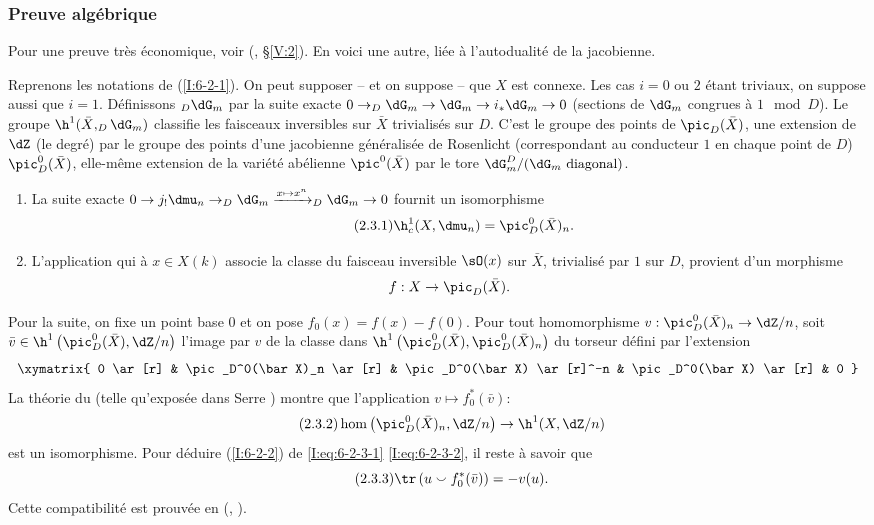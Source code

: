 \subsubsection{Preuve algébrique}\label{I:6-2-3}

Pour une preuve très économique, voir (, \S\ref{V:2}). 
En voici une autre, liée à l'autodualité de la jacobienne. 

Reprenons les notations de (\ref{I:6-2-1}). On peut supposer -- et on suppose -- 
que $X$ est connexe. Les cas $i=0$ ou $2$ étant triviaux, on suppose aussi 
que $i=1$. Définissons $_D\dG_m$ par la suite exacte 
$0\to _D\dG_m \to \dG_m \to i_*\dG_m\to 0$ (sections de $\dG_m$ congrues à 
$1\mod D$). Le groupe $\h^1(\bar X, _D\dG_m)$ classifie les faisceaux 
inversibles sur $\bar X$ trivialisés sur $D$. C'est le groupe des points de 
$\pic_D(\bar X)$, une extension de $\dZ$ (le degré) par le groupe des points 
d'une jacobienne généralisée de Rosenlicht (correspondant au conducteur 
$1$ en chaque point de $D$) $\pic_D^0(\bar X)$, elle-même extension de la 
variété abélienne $\pic^0(\bar X)$ par le tore 
$\dG_m^D/(\text{$\dG_m$ diagonal})$. 

\begin{enumerate}[\indent a)]
  \item {}La suite exacte 
    $0\to j_!\dmu_n \to _D\dG_m \xrightarrow{x\mapsto x^n} _D\dG_m\to 0$ fournit un 
    isomorphisme 
    \begin{equation*}\tag{2.3.1}\label{I:eq:6-2-3-1}
      \h_c^1(X,\dmu_n) = \pic_D^0(\bar X)_n \text{.}
    \end{equation*}
  \item L'application qui à $x\in X(k)$ associe la classe du faisceau 
    inversible $\sO(x)$ sur $\bar X$, trivialisé par $1$ sur $D$, provient 
    d'un morphisme 
    \[
      f:X \to \pic_D(\bar X) \text{.}
    \]
\end{enumerate}
Pour la suite, on fixe un point base $0$ et on pose $f_0(x)=f(x)-f(0)$. Pour 
tout homomorphisme $v:\pic_D^0(\bar X)_n \to \dZ/n$, soit 
$\bar v\in \h^1\left(\pic_D^0(\bar X),\dZ/n\right)$ l'image par $v$ de la classe 
dans $\h^1\left(\pic_D^0(\bar X),\pic_D^0(\bar X)_n\right)$ du torseur défini 
par l'extension 
\[\xymatrix{
  0 \ar[r] 
    & \pic_D^0(\bar X)_n \ar[r] 
    & \pic_D^0(\bar X) \ar[r]^-n 
    & \pic_D^0(\bar X) \ar[r] 
    & 0
}\]
La théorie du  (telle qu'exposée dans 
Serre ) montre que l'application $v\mapsto f_0^*(\bar v)$: 
\begin{equation*}\tag{2.3.2}\label{I:eq:6-2-3-2}
  \hom\left(\pic_D^0(\bar X)_n,\dZ/n\right) \to \h^1(X,\dZ/n)
\end{equation*}
est un isomorphisme. Pour déduire (\ref{I:6-2-2}) de \eqref{I:eq:6-2-3-1} 
\eqref{I:eq:6-2-3-2}, il reste à savoir que 
\begin{equation*}\tag{2.3.3}\label{I:eq:6-2-3-3}
  \tr\left(u \smallsmile f_0^*(\bar v)\right) = -v(u) \text{.}
\end{equation*}
Cette compatibilité est prouvée en (, ).

